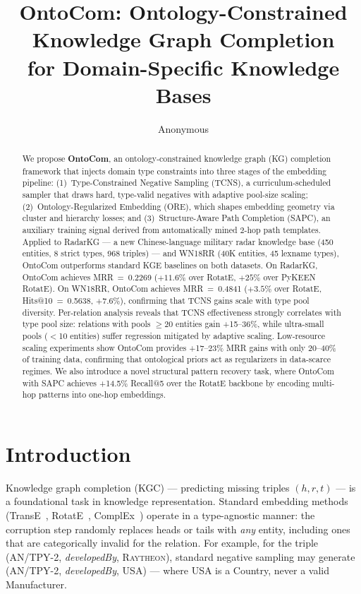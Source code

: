 \documentclass[10pt,twocolumn]{article}
\title{OntoCom: Ontology-Constrained Knowledge Graph Completion\\
for Domain-Specific Knowledge Bases}
\author{Anonymous}
\date{}
\begin{document}
\maketitle

\begin{abstract}
We propose \textbf{OntoCom}, an ontology-constrained knowledge graph (KG) completion
framework that injects domain type constraints into three stages of the embedding
pipeline: (1)~Type-Constrained Negative Sampling (TCNS), a curriculum-scheduled
sampler that draws hard, type-valid negatives with adaptive pool-size scaling;
(2)~Ontology-Regularized Embedding (ORE), which shapes embedding geometry via
cluster and hierarchy losses; and (3)~Structure-Aware Path Completion (SAPC), an
auxiliary training signal derived from automatically mined 2-hop path templates.
Applied to RadarKG --- a new Chinese-language military radar knowledge base (450
entities, 8 strict types, 968 triples) --- and WN18RR (40K entities, 45 lexname
types), OntoCom outperforms standard KGE baselines on both datasets.
On RadarKG, OntoCom achieves MRR~=~0.2269 ($+11.6\%$ over RotatE, $+25\%$
over PyKEEN RotatE). On WN18RR, OntoCom achieves MRR~=~0.4841
($+3.5\%$ over RotatE, Hits@10~=~0.5638, $+7.6\%$),
confirming that TCNS gains scale with type pool diversity.
Per-relation analysis reveals that TCNS effectiveness strongly correlates with
type pool size: relations with pools $\geq$20 entities gain +15--36\%, while
ultra-small pools ($<$10 entities) suffer regression mitigated by adaptive scaling.
Low-resource scaling experiments show OntoCom provides +17--23\% MRR gains with
only 20--40\% of training data, confirming that ontological priors act as
regularizers in data-scarce regimes.
We also introduce a novel structural pattern recovery task, where OntoCom with SAPC
achieves +14.5\% Recall@5 over the RotatE backbone by encoding multi-hop
patterns into one-hop embeddings.
\end{abstract}

\section{Introduction}

Knowledge graph completion (KGC) --- predicting missing triples $(h, r, t)$ ---
is a foundational task in knowledge representation. Standard embedding methods
(TransE~\cite{bordes2013translating}, RotatE~\cite{sun2019rotate},
ComplEx~\cite{trouillon2016complex}) operate in a type-agnostic manner: the
corruption step randomly replaces heads or tails with \emph{any} entity, including
ones that are categorically invalid for the relation. For example, for the triple
(\textsc{AN/TPY-2}, \textit{developedBy}, \textsc{Raytheon}), standard negative
sampling may generate (\textsc{AN/TPY-2}, \textit{developedBy}, \textsc{USA}) ---
where \textsc{USA} is a Country, never a valid Manufacturer.
\end{document}
